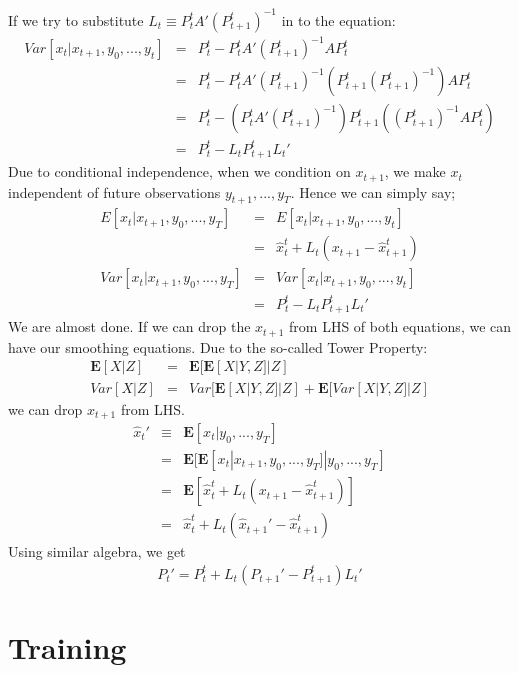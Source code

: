 If we try to substitute $L_t \equiv P_{t}^tA'(P_{t+1}^t)^{-1}$ in to the
equation:
\begin{eqnarray*}
Var[x_t|x_{t+1},y_0,...,y_t] &=& P_{t}^t - P_{t}^t A'(P_{t+1}^t)^{-1}AP_{t}^t \\
&=& P_{t}^t - P_{t}^tA'(P_{t+1}^t)^{-1} (P_{t+1}^t(P_{t+1}^t)^{-1}) AP_{t}^t\\
&=& P_{t}^t - (P_{t}^tA'(P_{t+1}^t)^{-1}) P_{t+1}^t ((P_{t+1}^t)^{-1} AP_{t}^t)\\
&=& P_{t}^t - L_t  P_{t+1}^t L_t'
\end{eqnarray*}
Due to conditional independence, when we condition on $x_{t+1}$, we make $x_t$
independent of future observations $y_{t+1},...,y_T$. Hence we can simply say;
\begin{eqnarray*}
E[x_t|x_{t+1},y_0,...,y_T]  &=& E[x_t|x_{t+1},y_0,...,y_t]\\
&=& \hat{x}_{t}^t +L_t(x_{t+1}-\hat{x}_{t+1}^t) \\
Var[x_t|x_{t+1},y_0,...,y_T]  &=& Var[x_t|x_{t+1},y_0,...,y_t] \\
&=& P_{t}^t - L_t  P_{t+1}^t L_t'
\end{eqnarray*}
We are almost done. If we can drop the $x_{t+1}$ from LHS of both equations, we
can have our smoothing equations. Due to the so-called Tower Property:
\begin{eqnarray*}
\mathbf{E}[X|Z] &=& \mathbf{E}[\mathbf{E}[X|Y,Z]|Z]\\
Var[X|Z] &=& Var[\mathbf{E}[X|Y,Z]|Z] + \mathbf{E}[Var[X|Y,Z]|Z]
\end{eqnarray*}
we can drop $x_{t+1}$ from LHS.
\begin{eqnarray}
\hat{x}_{t}' & \equiv & \mathbf{E}[x_t|y_0,...,y_T] \nonumber\\
& = & \mathbf{E}[\mathbf{E}[x_t|x_{t+1},y_0,...,y_T]|y_0,...,y_T] \nonumber\\
& = & \mathbf{E}[\hat{x}_{t}^t +L_t(x_{t+1}-\hat{x}_{t+1}^t)] \nonumber\\
& = & \hat{x}_{t}^t +L_t(\hat{x}_{t+1}' -\hat{x}_{t+1}^t) \label{xsmooth}
\end{eqnarray}
Using similar algebra, we get
\begin{eqnarray*}
P_{t}'  = P_{t}^t + L_t(P_{t+1}'-P_{t+1}^t)L_t'
\end{eqnarray*}


\section{Training}

